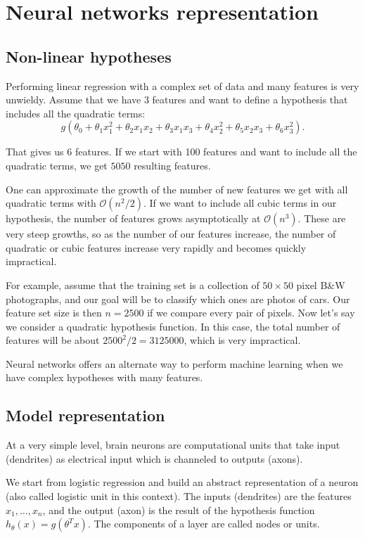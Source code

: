 \documentclass[a4paper,11pt]{report}
\begin{document}
\section{Neural networks representation}

\subsection*{Non-linear hypotheses}

Performing linear regression with a complex set of data and many features is very unwieldy. Assume that we have 3 features and want to define a hypothesis that includes all the quadratic terms:
$$g(\theta_0 + \theta_1x_1^2 + \theta_2x_1x_2 + \theta_3x_1x_3 + \theta_4x_2^2 + \theta_5x_2x_3 + \theta_6x_3^2).$$

That gives us 6 features. If we start with 100 features and want to include all the quadratic terms, we get $5050$ resulting features.

One can approximate the growth of the number of new features we get with all quadratic terms with $\mathcal{O}({n^2}/{2})$. If we want to include all cubic terms in our hypothesis, the number of features grows asymptotically at $\mathcal{O}(n^3)$. These are very steep growths, so as the number of our features increase, the number of quadratic or cubic features increase very rapidly and becomes quickly impractical.

For example, assume that the training set is a collection of $50 \times 50$ pixel B\&W photographs, and our goal will be to classify which ones are photos of cars. Our feature set size is then $n = 2500$ if we compare every pair of pixels. Now let's say we consider a quadratic hypothesis function. In this case, the total number of features will be about $2500^2 / 2 = 3125000$, which is very impractical.

Neural networks offers an alternate way to perform machine learning when we have complex hypotheses with many features.

\subsection*{Model representation}

At a very simple level, brain neurons are computational units that take input (dendrites) as electrical input which is channeled to outputs (axons).

We start from logistic regression and build an abstract representation of a neuron (also called logistic unit in this context). The inputs (dendrites) are the features $x_1, \ldots, x_n$, and the output (axon) is the result of the hypothesis function $h_\theta(x) = g(\theta^Tx)$. The components of a layer are called nodes or units.
\end{document}
